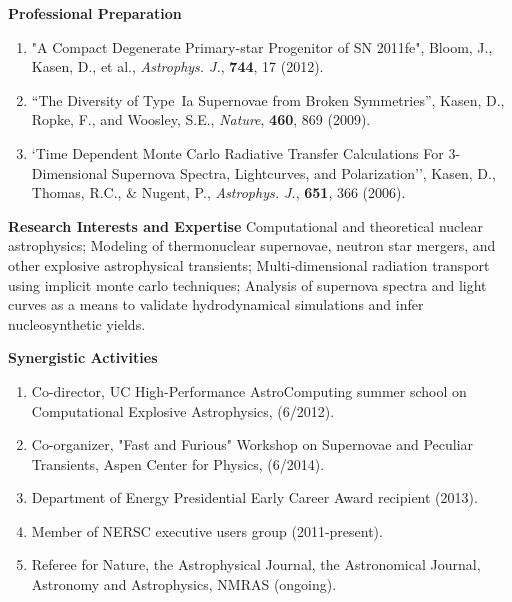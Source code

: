 \documentclass[11pt,letterpaper,english]{article}
\begin{document}
\begin{flushleft} {\bf Professional Preparation}
\begin{enumerate}
\item "A Compact Degenerate Primary-star Progenitor of SN 2011fe", Bloom, J., Kasen, D., et al., \emph{Astrophys. J.}, {\bf 744}, 17 (2012).

\item  ``The Diversity of Type~Ia Supernovae from Broken Symmetries'', Kasen, D., Ropke, F., and Woosley, S.E., \emph {Nature},  {\bf 460}, 869 (2009).

\item `Time Dependent Monte Carlo Radiative Transfer Calculations For
3-Dimensional Supernova Spectra, Lightcurves, and Polarization'', Kasen, D., Thomas, R.C., \& Nugent, P., \emph{Astrophys. J.}, {\bf 651}, 366 (2006). 

\end{enumerate} 

\vspace{-6pt}
{\bf Research Interests and Expertise}
{\parindent 16pt
Computational and theoretical nuclear astrophysics; Modeling of thermonuclear supernovae, neutron star mergers, and other explosive astrophysical transients; Multi-dimensional radiation transport using implicit monte carlo techniques;  Analysis of supernova spectra and light curves as a means to validate hydrodynamical simulations and infer nucleosynthetic yields. 
}


\vspace{.04in}
{\bf Synergistic Activities}
\vspace{-6pt}
\begin{enumerate} \itemsep1pt \parskip0pt 
\item Co-director, UC High-Performance AstroComputing summer school on Computational Explosive Astrophysics, (6/2012).
\item Co-organizer, "Fast and Furious" Workshop on Supernovae and Peculiar Transients, Aspen Center for Physics, (6/2014).
\item Department of Energy Presidential Early Career Award recipient (2013).
\item Member of NERSC executive users group (2011-present).
\item Referee for Nature, the Astrophysical Journal, the Astronomical Journal, Astronomy and Astrophysics, NMRAS (ongoing).
\end{enumerate} 


\end{flushleft}
\end{document}
